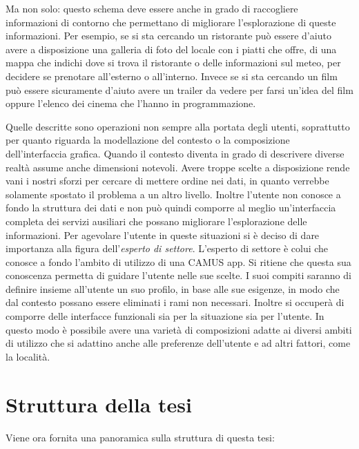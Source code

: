 Ma non solo: questo schema deve essere anche in grado di raccogliere informazioni di contorno che permettano di migliorare l'esplorazione di queste informazioni. Per esempio, se si sta cercando un ristorante può essere d'aiuto avere a disposizione una galleria di foto del locale con i piatti che offre, di una mappa che indichi dove si trova il ristorante o delle informazioni sul meteo, per decidere se prenotare all'esterno o all'interno. Invece se si sta cercando un film può essere sicuramente d'aiuto avere un trailer da vedere per farsi un'idea del film oppure l'elenco dei cinema che l'hanno in programmazione.

Quelle descritte sono operazioni non sempre alla portata degli utenti, soprattutto per quanto riguarda la modellazione del contesto o la composizione dell'interfaccia grafica. Quando il contesto diventa in grado di descrivere diverse realtà assume anche dimensioni notevoli. Avere troppe scelte a disposizione rende vani i nostri sforzi per cercare di mettere ordine nei dati, in quanto verrebbe solamente spostato il problema a un altro livello. Inoltre l'utente non conosce a fondo la struttura dei dati e non può quindi comporre al meglio un'interfaccia completa dei servizi ausiliari che possano migliorare l'esplorazione delle informazioni. Per agevolare l'utente in queste situazioni si è deciso di dare importanza alla figura dell'\emph{esperto di settore}. L'esperto di settore è colui che conosce a fondo l'ambito di utilizzo di una CAMUS app. Si ritiene che questa sua conoscenza permetta di guidare l'utente nelle sue scelte. I suoi compiti saranno di definire insieme all'utente un suo profilo, in base alle sue esigenze, in modo che dal contesto possano essere eliminati i rami non necessari. Inoltre si occuperà di comporre delle interfacce funzionali sia per la situazione sia per l'utente. In questo modo è possibile avere una varietà di composizioni adatte ai diversi ambiti di utilizzo che si adattino anche alle preferenze dell'utente e ad altri fattori, come la località.

\section{Struttura della tesi}

Viene ora fornita una panoramica sulla struttura di questa tesi:

